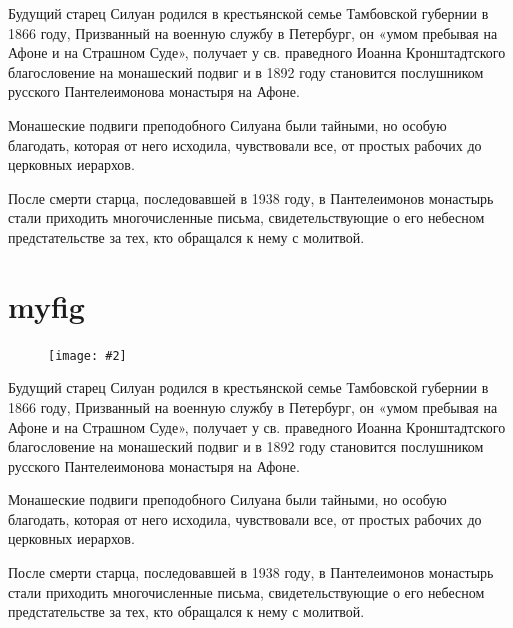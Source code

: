 \documentclass[12pt,a4paper]{article}
\newcommand{\myfigr}[2][0.43]{
    \begin{figure}
    \texttt{[image: \#2]}
    \end{figure}
}
\begin{document}
Будущий старец Силуан родился в крестьянской семье Тамбовской губернии в 1866 году, Призванный на военную службу в Петербург, он «умом пребывая на Афоне и на Страшном Суде», получает у св. праведного Иоанна Кронштадтского благословение на монашеский подвиг и в 1892 году становится послушником русского Пантелеимонова монастыря на Афоне.

Монашеские подвиги преподобного Силуана были тайными, но особую благодать, которая от него исходила, чувствовали все, от простых рабочих до церковных иерархов. 

После смерти старца, последовавшей в 1938 году, в Пантелеимонов монастырь стали приходить многочисленные письма, свидетельствующие о его небесном предстательстве за тех, кто обращался к нему с молитвой.

\newpage\section{myfig}
\setlength\intextsep{0pt}
\myfigr[0.15]{img/521.jpg}

Будущий старец Силуан родился в крестьянской семье Тамбовской губернии в 1866 году, Призванный на военную службу в Петербург, он «умом пребывая на Афоне и на Страшном Суде», получает у св. праведного Иоанна Кронштадтского благословение на монашеский подвиг и в 1892 году становится послушником русского Пантелеимонова монастыря на Афоне.

Монашеские подвиги преподобного Силуана были тайными, но особую благодать, которая от него исходила, чувствовали все, от простых рабочих до церковных иерархов. 

После смерти старца, последовавшей в 1938 году, в Пантелеимонов монастырь стали приходить многочисленные письма, свидетельствующие о его небесном предстательстве за тех, кто обращался к нему с молитвой.
\end{document}
